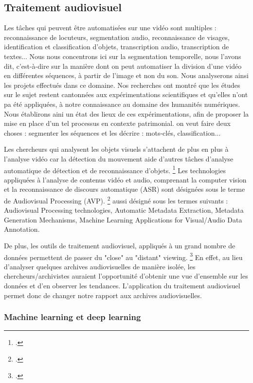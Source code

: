 \subsection{Traitement audiovisuel}

Les tâches qui peuvent être automatisées sur une vidéo sont multiples : reconnaissance de locuteurs, segmentation audio, reconnaissance de visages, identification et classification d'objets, transcription audio, transcription de textes... Nous nous concentrons ici sur la segmentation temporelle, nous l'avons dit, c'est-à-dire sur la manière dont on peut automatiser la division d'une vidéo en différentes séquences, à partir de l'image et non du son. Nous analyserons ainsi les projets effectués dans ce domaine. Nos recherches ont montré que les études sur le sujet restent cantonnées aux expérimentations scientifiques et qu'elles n'ont pa été appliquées, à notre connaissance au domaine des humanités numériques. Nous établirons aini un état des lieux de ces expérimentations, afin de proposer la mise en place d'un tel processus en contexte patrimonial. 
on veut faire deux choses : segmenter les séquences et les décrire : mots-clés, classification... 

Les chercheurs qui analysent les objets visuels s'attachent de plus en plus à l'analyse vidéo car la détection du mouvement aide d'autres tâches d'analyse automatique de détection et de reconnaissance d'objets.  \footcite{brostow2009}
Les technologies appliquées à l'analyse de contenus vidéo et audio, comprenant la computer vision et la reconnaissance de discours automatique (ASR) sont désignées sous le terme de Audiovisual Processing (AVP). \footcite{noord2021}
aussi désigné sous les termes suivants : Audiovisual Processing technologies, Automatic Metadata Extraction, Metadata Generation Mechanisms, Machine Learning Applications for Visual/Audio Data Annotation.
 
De plus, les outils de traitement audiovisuel, appliqués à un grand nombre de données permettent de passer du "close" au "distant" viewing. \footcite{noord2021} En effet, au lieu d'analyser quelques archives audiovisuelles de manière isolée, les chercheurs/archivistes auraient l'opportunité d'obtenir une vue d'ensemble sur les données et d'en observer les tendances. L'application du traitement audiovisuel permet donc de changer notre rapport aux archives audiovisuelles. 

\subsubsection{Machine learning et deep learning}

